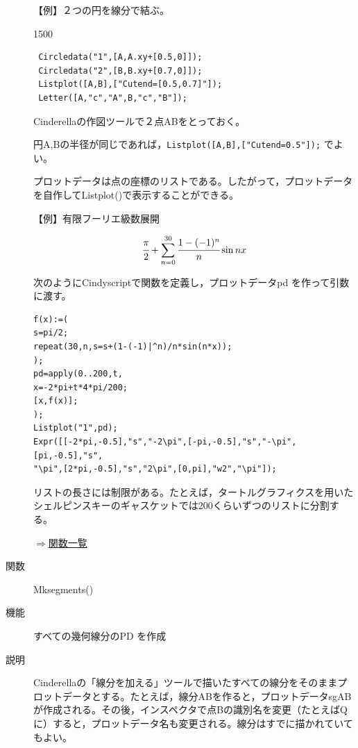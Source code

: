 \documentclass[papersize,a4paper,10pt,uplatex]{jsarticle}
\begin{document}
\begin{description}
\vspace{\baselineskip}
【例】２つの円を線分で結ぶ。

\begin{layer}{150}{0}
\end{layer}
\hspace{20mm}

\begin{verbatim}
 Circledata("1",[A,A.xy+[0.5,0]]);
 Circledata("2",[B,B.xy+[0.7,0]]);
 Listplot([A,B],["Cutend=[0.5,0.7]"]);
 Letter([A,"c","A",B,"c","B"]);
\end{verbatim}
Cinderellaの作図ツールで２点ABをとっておく。

円A,Bの半径が同じであれば，\verb|Listplot([A,B],["Cutend=0.5"]);| でよい。

\vspace{\baselineskip}
プロットデータは点の座標のリストである。したがって，プロットデータを自作してListplot()で表示することができる。

\vspace{\baselineskip}
【例】有限フーリエ級数展開

 \[\cfrac{\pi}{2}+\sum_{n=0}^{30} \cfrac{1-(-1)^n}{n}\sin nx\]

次のようにCindyscriptで関数を定義し，プロットデータpd を作って引数に渡す。
\begin{verbatim}
f(x):=(
s=pi/2;
repeat(30,n,s=s+(1-(-1)|^n)/n*sin(n*x));
);
pd=apply(0..200,t,
x=-2*pi+t*4*pi/200;
[x,f(x)];
);
Listplot("1",pd);
Expr([[-2*pi,-0.5],"s","-2\pi",[-pi,-0.5],"s","-\pi",[pi,-0.5],"s",
"\pi",[2*pi,-0.5],"s","2\pi",[0,pi],"w2","\pi"]);
\end{verbatim}

\vspace{\baselineskip}
\hspace{20mm}

\vspace{\baselineskip}
 リストの長さには制限がある。たとえば，タートルグラフィクスを用いたシェルピンスキーのギャスケットでは200くらいずつのリストに分割する。
 
 \hspace{20mm}\scalebox{0.8}{ }
\begin{flushright}\hyperlink{functionlist}{$\Rightarrow$関数一覧}\end{flushright}

\vspace{\baselineskip}
\hypertarget{mksegments}{}
\item[関数]Mksegments()
\item[機能]すべての幾何線分のPD を作成
\item[説明]Cinderellaの「線分を加える」ツールで描いたすべての線分をそのままプロットデータとする。たとえば，線分ABを作ると，プロットデータsgABが作成される。その後，インスペクタで点Bの識別名を変更（たとえばQに）すると，プロットデータ名も変更される。線分はすでに描かれていてもよい。


\end{description}
\end{document}

